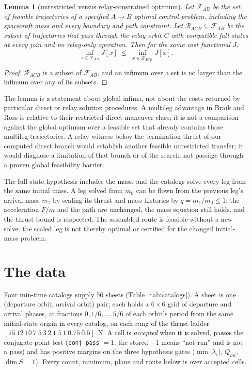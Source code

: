 \documentclass[11pt]{article}
\newtheorem{lemma}{Lemma}
\begin{document}
\begin{lemma}[unrestricted versus relay-constrained optimum]
Let $\mathcal{F}_{AB}$ be the set of feasible trajectories of a specified $A \to B$ optimal control
problem, including the spacecraft mass and every boundary and path constraint. Let
$\mathcal{R}_{ACB} \subseteq \mathcal{F}_{AB}$ be the subset of trajectories that pass through the
relay orbit $C$ with compatible full states at every join and no relay-only operation. Then for the
same cost functional $J$,
\[
\inf_{x \in \mathcal{F}_{AB}} J[x] \;\le\; \inf_{x \in \mathcal{R}_{ACB}} J[x].
\]
\end{lemma}
\begin{proof}
$\mathcal{R}_{ACB}$ is a subset of $\mathcal{F}_{AB}$, and an infimum over a set is no larger than
the infimum over any of its subsets.
\end{proof}

The lemma is a statement about global infima, not about the costs returned by particular direct or
relay solution procedures. A multileg advantage in Braik and Ross is relative to their restricted
direct-maneuver class; it is not a comparison against the global optimum over a feasible set that
already contains those multileg trajectories. A relay witness below the termination thrust of our
computed direct branch would establish another feasible unrestricted transfer; it would diagnose a
limitation of that branch or of the search, not passage through a proven global feasibility barrier.

The full-state hypothesis includes the mass, and the catalogs solve every leg from the same initial
mass. A leg solved from $m_0$ can be flown from the previous leg's arrival mass $m_1$ by scaling its
thrust and mass histories by $q = m_1/m_0 \le 1$: the acceleration $F/m$ and the path are unchanged,
the mass equation still holds, and the thrust bound is respected. The assembled route is feasible
without a new solve; the scaled leg is not thereby optimal or certified for the changed
initial-mass problem.

\section{The data}\label{sec:data}
Four min-time catalogs supply 56 sheets (Table~\ref{tab:catalogs}). A sheet is one (departure orbit,
arrival orbit) pair; each holds a $6 \times 6$ grid of departure and arrival phases, at fractions
$0, 1/6, \dots, 5/6$ of each orbit's period from the same initial-state origin in every catalog, on
each rung of the thrust ladder $[15\ 12\ 10\ 7\ 5\ 3\ 2\ 1.5\ 1\ 0.75\ 0.5]$~N. A cell is
\emph{accepted} when it is solved, passes the conjugate-point test (\texttt{conj\_pass} $=1$; the
stored $-1$ means ``not run'' and is not a pass) and has positive margins on the three hypothesis
gates ($\min|\lambda_v|$, $Q_{mt}$, $\dim S = 1$). Every count, minimum, plane and route below is
over accepted cells.
\end{document}
